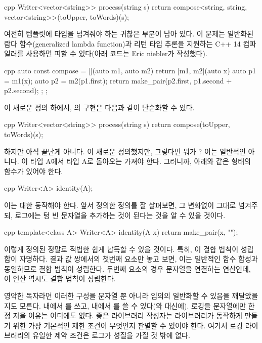 \begin{snip}{cpp}
Writer<vector<string>> process(string s) { 
    return compose<string, string, vector<string>>(toUpper, toWords)(s);
}
\end{snip}
여전히  템플릿에 타입을 넘겨줘야 하는 귀찮은 부분이 남아 있다.
이 문제는 일반화된 람다 함수(generalized lambda function)과 리턴 타입 추론을 지원하는 C++ 14 컴파일러를 사용하면 피할 수 있다(아래 코드는 Eric niebler가 작성했다).

\begin{snip}{cpp}
auto const compose = [](auto m1, auto m2) { 
    return [m1, m2](auto x) { 
        auto p1 = m1(x);
        auto p2 = m2(p1.first);
        return make_pair(p2.first, p1.second + p2.second);
    };
};
\end{snip}
이 새로운 정의 하에서, 의 구현은 다음과 같이 단순화할 수 있다.

\begin{snip}{cpp}
Writer<vector<string>> process(string s) {
    return compose(toUpper, toWords)(s);
}
\end{snip}
하지만 아직 끝난게 아니다. 이 새로운   정의했지만, 그렇다면 뭐가 ?
이는 일반적인  아니다. 이  타입 A에서 타입 A로 돌아오는  가져야 한다. 그러니까, 아래와 같은 형태의  함수가 있어야 한다.

\begin{snip}{cpp}
Writer<A> identity(A);
\end{snip}
이는  대한  동작해야 한다.
앞서 정의한  정의를 잘 살펴보면,  그  변화없이 그대로 넘겨주되, 로그에는 텅 빈 문자열을 추가하는 것이  된다는 것을 알 수 있을 것이다.

\begin{snip}{cpp}
template<class A> Writer<A> identity(A x) {
    return make_pair(x, "");
}
\end{snip}
이렇게 정의된  정말로 적법한  쉽게 납득할 수 있을 것이다.
특히, 이   결합 법칙이 성립함이 자명하다.
결과 값 쌍에서의 첫번째 요소만 놓고 보면, 이는 일반적인 함수 합성과 동일하므로 결합 법칙이 성립한다. 두번째 요소의 경우 문자열을 연결하는 연산인데, 이 연산 역시도 결합 법칙이 성립한다.

영악한 독자라면 이러한 구성을 문자열 \trMonoid 뿐 아니라 임의의  일반화할 수 있음을 깨달았을 지도 모른다.
 내에서 를 쓰고,  내에서 를 쓸 수 있다(\code{+}와  대신에).
로깅을 문자열에만 한정 지을 이유는 어디에도 없다. 좋은 라이브러리 작성자는 라이브러리가 동작하게 만들기 위한 가장 기본적인 제한 조건이 무엇인지 판별할 수 있어야 한다.
여기서 로깅 라이브러리의 유일한 제약 조건은 로그가  성질을 가질 것 밖에 없다. %

